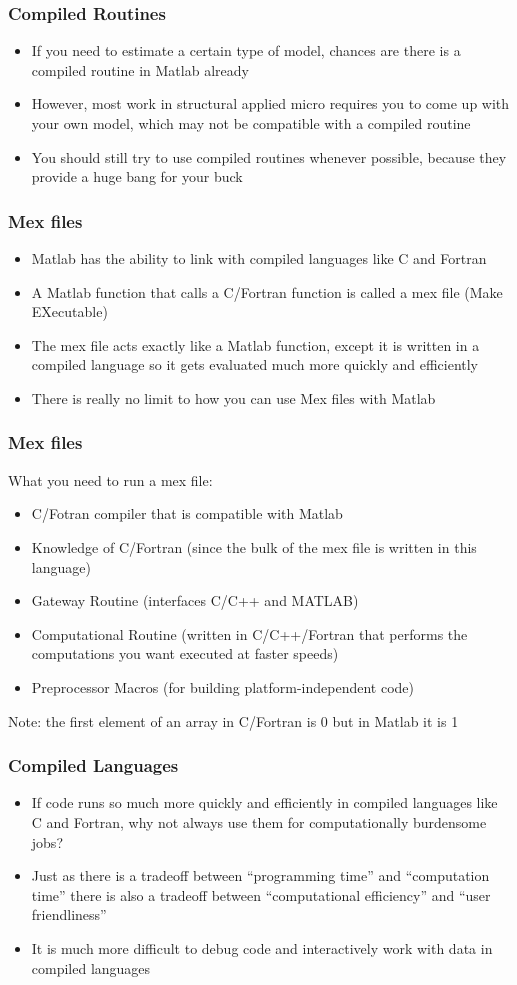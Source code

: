 \documentclass[english,xcolor=dvipsnames]{beamer}
\newcommand{\bi}{\begin{itemize}}
\newcommand{\ei}{\end{itemize}}
\begin{document}
\begin{frame}
\frametitle{Compiled Routines}
   \bi 
   \item If you need to estimate a certain type of model, chances are there is a compiled routine in Matlab already
   \item However, most work in structural applied micro requires you to come up with your own model, which may not be compatible with a compiled routine
   \item You should still try to use compiled routines whenever possible, because they provide a huge bang for your buck
   \ei
\end{frame}

\begin{frame}
\frametitle{Mex files}
   \bi 
   \item Matlab has the ability to link with compiled languages like C and Fortran
   \item A Matlab function that calls a C/Fortran function is called a mex file (Make EXecutable)
   \item The mex file acts exactly like a Matlab function, except it is written in a compiled language so it gets evaluated much more quickly and efficiently
   \item There is really no limit to how you can use Mex files with Matlab
   \ei
\end{frame}

\begin{frame}
\frametitle{Mex files}
   What you need to run a mex file:
      \bi 
      \item C/Fotran compiler that is compatible with Matlab
      \item Knowledge of C/Fortran (since the bulk of the mex file is written in this language)
      \item Gateway Routine (interfaces C/C++ and MATLAB)
      \item Computational Routine (written in C/C++/Fortran that performs the computations you want executed at faster speeds)
      \item Preprocessor Macros (for building platform-independent code)
      \ei
   Note: the first element of an array in C/Fortran is 0 but in Matlab it is 1

\end{frame}

\begin{frame}
\frametitle{Compiled Languages}
   \bi 
   \item If code runs so much more quickly and efficiently in compiled languages like C and Fortran, why not always use them for computationally burdensome jobs?
   \item Just as there is a tradeoff between ``programming time'' and ``computation time'' there is also a tradeoff between ``computational efficiency'' and ``user friendliness''
   \item It is much more difficult to debug code and interactively work with data in compiled languages
   \ei
\end{frame}
\end{document}
